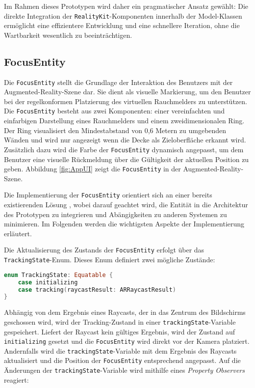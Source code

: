 Im Rahmen dieses Prototypen wird daher ein pragmatischer Ansatz gewählt: Die direkte Integration der \texttt{RealityKit}-Komponenten innerhalb der Model-Klassen ermöglicht eine effizientere Entwicklung und eine schnellere Iteration, ohne die Wartbarkeit wesentlich zu beeinträchtigen.

\subsection{FocusEntity}

Die \texttt{FocusEntity} stellt die Grundlage der Interaktion des Benutzers mit der Augmented-Reality-Szene dar. Sie dient als visuelle Markierung, um den Benutzer bei der regelkonformen Platzierung des virtuellen Rauchmelders zu unterstützen. Die \texttt{FocusEntity} besteht aus zwei Komponenten: einer vereinfachten und einfarbigen Darstellung eines Rauchmelders und einem zweidimensionalen Ring. Der Ring visualisiert den Mindestabstand von 0,6 Metern zu umgebenden Wänden und wird nur angezeigt wenn die Decke als Zieloberfläche erkannt wird. Zusätzlich dazu wird die Farbe der \texttt{FocusEntity} dynamisch angepasst, um dem Benutzer eine visuelle Rückmeldung über die Gültigkeit der aktuellen Position zu geben. Abbildung \ref{fig:AppUI} zeigt die \texttt{FocusEntity} in der Augmented-Reality-Szene.

Die Implementierung der \texttt{FocusEntity} orientiert sich an einer bereits existierenden Lösung \cite{cobb2019focusEntity}, wobei darauf geachtet wird, die Entität in die Architektur des Prototypen zu integrieren und Abängigkeiten zu anderen Systemen zu minimieren. Im Folgenden werden die wichtigsten Aspekte der Implementierung erläutert.

Die Aktualisierung des Zustands der \texttt{FocusEntity} erfolgt über das \texttt{TrackingState}-Enum. Dieses Enum definiert zwei mögliche Zustände:

\begin{lstlisting}[language=Swift]
enum TrackingState: Equatable {
    case initializing
    case tracking(raycastResult: ARRaycastResult)
}
\end{lstlisting}

Abhängig von dem Ergebnis eines Raycasts, der in das Zentrum des Bildschirms geschossen wird, wird der Tracking-Zustand in einer \texttt{trackingState}-Variable gespeichert. Liefert der Raycast kein gültiges Ergebnis, wird der Zustand auf \texttt{initializing} gesetzt und die \texttt{FocusEntity} wird direkt vor der Kamera platziert. Andernfalls wird die \texttt{trackingState}-Variable mit dem Ergebnis des Raycasts aktualisiert und die Position der \texttt{FocusEntity} entsprechend angepasst. Auf die Änderungen der \texttt{trackingState}-Variable wird mithilfe eines \textit{Property Observers} reagiert: 

